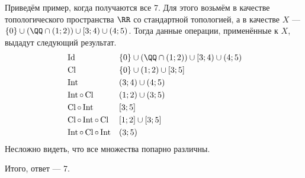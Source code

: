 \documentclass[12pt,a4paper]{article}
\DeclareMathOperator{\Cl}{Cl}
\DeclareMathOperator{\Int}{Int}
\DeclareMathOperator{\Id}{Id}
\begin{document}
\begin{problem}{18}
        Приведём пример, когда получаются все 7. Для этого возьмём в качестве топологического пространства $\RR$ со стандартной топологией, а в качестве $X$ --- $\{0\} \cup (\QQ \cap (1; 2)) \cup [3; 4) \cup (4; 5)$. Тогда данные операции, применённые к $X$, выдадут следующий результат.
        \begin{align*}
            &\Id&
            &\{0\} \cup (\QQ \cap (1; 2)) \cup [3; 4) \cup (4; 5)\\
            &\Cl&
            &\{0\} \cup (1; 2) \cup [3; 5]\\
            &\Int&
            &(3; 4) \cup (4; 5)\\
            &\Int\circ\Cl&
            &(1; 2) \cup (3; 5)\\
            &\Cl\circ\Int&
            &[3; 5]\\
            &\Cl\circ\Int\circ\Cl&
            &[1; 2] \cup [3; 5]\\
            &\Int\circ\Cl\circ\Int&
            &(3; 5)\\
        \end{align*}
        Несложно видеть, что все множества попарно различны.

        Итого, ответ --- 7.
    \end{problem}
\end{document}
